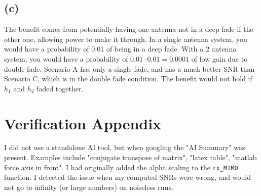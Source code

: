 \documentclass[]{article}
\begin{document}
	\subsection*{(c)}
	The benefit comes from potentially having one antenna not in a deep fade if the other one, allowing power to make it through. In a single antenna system, you would have a probability of 0.01 of being in a deep fade. With a 2 antenna system, you would have a probability of $0.01 \cdot 0.01 = 0.0001$ of low gain due to double fade. Scenario A has only a single fade, and has a much better SNR than Scenario C, which is in the double fade condition. The benefit would not hold if $h_1$ and $h_2$ faded together.
	
	\section*{Verification Appendix}
	I did not use a standalone AI tool, but when googling the "AI Summary" was present. Examples include "conjugate transpose of matrix", "latex table", "matlab force axis in front". I had originally added the alpha scaling to the \verb|rx_MIMO| function. I detected the issue when my computed SNRs were wrong, and would not go to infinity (or large numbers) on noiseless runs.
\end{document}
